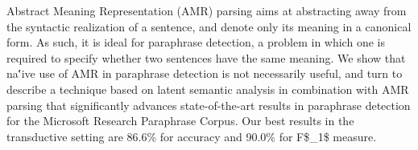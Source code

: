 Abstract Meaning Representation (AMR) parsing aims at abstracting away from the syntactic realization of a sentence, and denote only its meaning in a canonical form. As such, it is ideal for paraphrase detection, a problem in which one is required to specify whether two sentences have the same meaning. We show that na\''{i}ve use of AMR in paraphrase detection is not necessarily useful, and turn to describe a technique based on latent semantic analysis in combination with AMR parsing that significantly advances state-of-the-art results in paraphrase detection for the Microsoft Research Paraphrase Corpus. Our best results in the transductive setting are 86.6\% for accuracy and 90.0\% for F\$\_1\$ measure.
